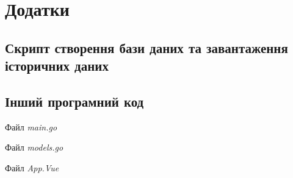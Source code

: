 \documentclass[oneside,14pt]{extarticle}
\begin{document}
\newpage

\section*{Додатки}
\setcounter{subsection}{0}
\subsection{Скрипт створення бази даних та завантаження історичних даних}
{\fontsize{8pt}{8pt}\selectfont}

\subsection{Інший програмний код}
Файл \textit{main.go}
{\fontsize{8pt}{8pt}\selectfont}

Файл \textit{models.go}
{\fontsize{8pt}{8pt}\selectfont}

Файл \textit{App.Vue}
{\fontsize{8pt}{8pt}\selectfont}
\end{document}
